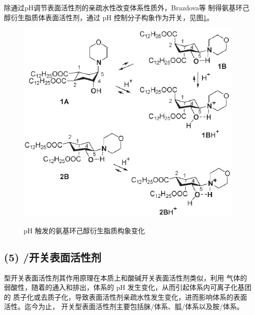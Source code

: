 \documentclass[bachelor,winfonts,replaceperiod]{jnuthesis}
\begin{document}
    除通过pH调节表面活性剂的亲疏水性改变体系性质外，Brazdova\cite{李云霞2011,brazdova2008}等
    制得氨基环己醇衍生脂质体表面活性剂，通过 pH 控制分子构象作为开关，见图\ref{fig:switchable-ph-conformation}。
    \begin{figure}[htbp]
        \centering
        \includegraphics[width=.5\textwidth]{figure/switchable-ph-conformation.png}\\
        \caption{pH 触发的氨基环己醇衍生脂质构象变化\cite{brazdova2008}}
        \label{fig:switchable-ph-conformation}
    \end{figure}

    \subsection*{(5) /开关表面活性剂}
    型开关表面活性剂其作用原理在本质上和酸碱开关表面活性剂类似，利用
    气体的弱酸性，随着的通入和排出，体系的 pH 发生变化，从而引起体系内可离子化基团的
    质子化或去质子化，导致表面活性剂亲疏水性发生变化，进而影响体系的表面活性。迄今为止，
    开关型表面活性剂主要包括脒/体系、胍/体系以及胺/体系\cite{梅平2016}。
    
\end{document}
